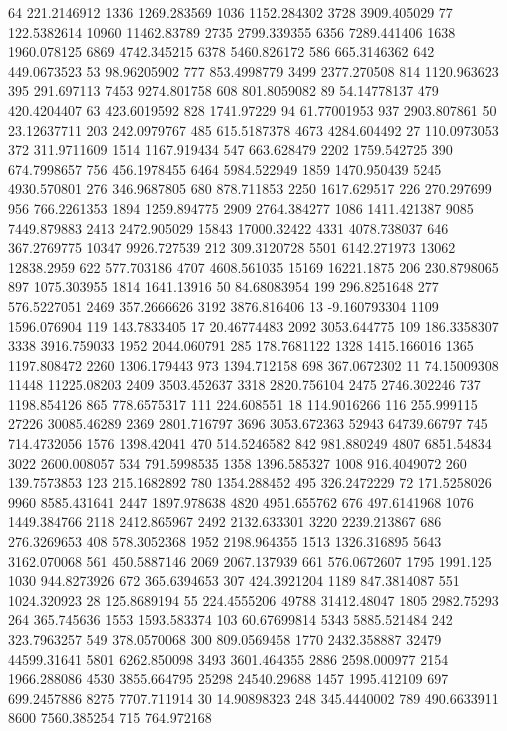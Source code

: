 64	221.2146912
1336	1269.283569
1036	1152.284302
3728	3909.405029
77	122.5382614
10960	11462.83789
2735	2799.339355
6356	7289.441406
1638	1960.078125
6869	4742.345215
6378	5460.826172
586	665.3146362
642	449.0673523
53	98.96205902
777	853.4998779
3499	2377.270508
814	1120.963623
395	291.697113
7453	9274.801758
608	801.8059082
89	54.14778137
479	420.4204407
63	423.6019592
828	1741.97229
94	61.77001953
937	2903.807861
50	23.12637711
203	242.0979767
485	615.5187378
4673	4284.604492
27	110.0973053
372	311.9711609
1514	1167.919434
547	663.628479
2202	1759.542725
390	674.7998657
756	456.1978455
6464	5984.522949
1859	1470.950439
5245	4930.570801
276	346.9687805
680	878.711853
2250	1617.629517
226	270.297699
956	766.2261353
1894	1259.894775
2909	2764.384277
1086	1411.421387
9085	7449.879883
2413	2472.905029
15843	17000.32422
4331	4078.738037
646	367.2769775
10347	9926.727539
212	309.3120728
5501	6142.271973
13062	12838.2959
622	577.703186
4707	4608.561035
15169	16221.1875
206	230.8798065
897	1075.303955
1814	1641.13916
50	84.68083954
199	296.8251648
277	576.5227051
2469	357.2666626
3192	3876.816406
13	-9.160793304
1109	1596.076904
119	143.7833405
17	20.46774483
2092	3053.644775
109	186.3358307
3338	3916.759033
1952	2044.060791
285	178.7681122
1328	1415.166016
1365	1197.808472
2260	1306.179443
973	1394.712158
698	367.0672302
11	74.15009308
11448	11225.08203
2409	3503.452637
3318	2820.756104
2475	2746.302246
737	1198.854126
865	778.6575317
111	224.608551
18	114.9016266
116	255.999115
27226	30085.46289
2369	2801.716797
3696	3053.672363
52943	64739.66797
745	714.4732056
1576	1398.42041
470	514.5246582
842	981.880249
4807	6851.54834
3022	2600.008057
534	791.5998535
1358	1396.585327
1008	916.4049072
260	139.7573853
123	215.1682892
780	1354.288452
495	326.2472229
72	171.5258026
9960	8585.431641
2447	1897.978638
4820	4951.655762
676	497.6141968
1076	1449.384766
2118	2412.865967
2492	2132.633301
3220	2239.213867
686	276.3269653
408	578.3052368
1952	2198.964355
1513	1326.316895
5643	3162.070068
561	450.5887146
2069	2067.137939
661	576.0672607
1795	1991.125
1030	944.8273926
672	365.6394653
307	424.3921204
1189	847.3814087
551	1024.320923
28	125.8689194
55	224.4555206
49788	31412.48047
1805	2982.75293
264	365.745636
1553	1593.583374
103	60.67699814
5343	5885.521484
242	323.7963257
549	378.0570068
300	809.0569458
1770	2432.358887
32479	44599.31641
5801	6262.850098
3493	3601.464355
2886	2598.000977
2154	1966.288086
4530	3855.664795
25298	24540.29688
1457	1995.412109
697	699.2457886
8275	7707.711914
30	14.90898323
248	345.4440002
789	490.6633911
8600	7560.385254
715	764.972168
